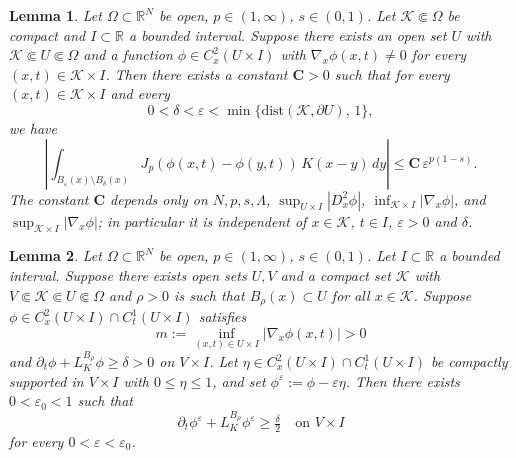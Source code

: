 \documentclass[10pt,a4paper]{amsart}
\newtheorem{lemma}{Lemma}
\newcommand{\R}{\mathbb{R}}
\begin{document}
\begin{lemma}\label{lem:pv-exists}
Let $\Omega \subset \R^N$ be open, $p \in (1,\infty)$,
$s \in (0,1)$. Let $\mathcal{K} \Subset \Omega$ be compact
and $I \subset \R$ a bounded interval. Suppose there exists
an open set $U$ with $\mathcal{K} \Subset U \Subset \Omega$
and a function $\phi \in C^2_x(U \times I)$ with
$\nabla_x\phi(x,t) \neq 0$ for every
$(x,t) \in \mathcal{K} \times I$. Then there exists a
constant $\mathbf{C} > 0$ such that for every
$(x,t) \in \mathcal{K} \times I$ and every
\[
  0 < \delta < \varepsilon <
  \min\bigl\{\mathrm{dist}(\mathcal{K},\partial U),\,
  1\bigr\},
\]
we have
\[
  \left| \int_{B_\varepsilon(x) \setminus B_\delta(x)}
  J_p(\phi(x,t)-\phi(y,t))\, K(x-y)\, dy \right|
  \le \mathbf{C}\,\varepsilon^{p(1-s)}.
\]
The constant $\mathbf{C}$ depends only on $N, p, s,
\Lambda$, $\sup_{U \times I}|D_x^2\phi|$,
$\inf_{\mathcal{K} \times I}|\nabla_x\phi|$, and
$\sup_{\mathcal{K} \times I}|\nabla_x\phi|$; in particular
it is independent of $x \in \mathcal{K}$, $t \in I$, $ \varepsilon>0$ and
$\delta$.
\end{lemma}

\begin{lemma}\label{lem:parabolic-perturb-down}
Let $\Omega \subset \R^N$ be open, $p \in (1,\infty)$,
$s \in (0,1)$. Let $I \subset \R$ a bounded interval. Suppose there exists
open sets $U,V$ and a compact set $\mathcal{K} $ with $V \Subset \mathcal{K} \Subset U \Subset \Omega$ and $\rho > 0$ is such that
$B_\rho(x) \subset U$ for all $x \in \mathcal{K}$.
Suppose
$\phi \in C^2_x(U \times I) \cap C^1_t(U \times I)$
satisfies
\[
  m := \inf_{(x,t) \in U \times I}|\nabla_x\phi(x,t)|
  > 0
\]
and $\partial_t\phi + L_K^{B_\rho}\phi \ge \delta > 0$
on $V \times I$. Let $\eta \in C^2_x(U \times I) \cap C^1_t(U \times I)$ be
compactly supported in $V \times I$ with $0 \le \eta \le 1$,
and set $\phi^\varepsilon := \phi - \varepsilon\eta$. Then
there exists $0<\varepsilon_0 <1$ such that
\[
  \partial_t\phi^\varepsilon
  + L_K^{B_\rho}\phi^\varepsilon \ge \tfrac{\delta}{2}
  \quad \text{on } V \times I
\]
for every $0 < \varepsilon < \varepsilon_0$.
\end{lemma}
\end{document}

